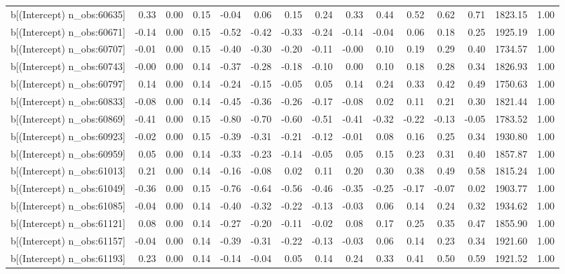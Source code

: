 \begin{table}[ht]
\begin{tabular}{rrrrrrrrrrrrrrr}
  b[(Intercept) n\_obs:60635] & 0.33 & 0.00 & 0.15 & -0.04 & 0.06 & 0.15 & 0.24 & 0.33 & 0.44 & 0.52 & 0.62 & 0.71 & 1823.15 & 1.00 \\ 
  b[(Intercept) n\_obs:60671] & -0.14 & 0.00 & 0.15 & -0.52 & -0.42 & -0.33 & -0.24 & -0.14 & -0.04 & 0.06 & 0.18 & 0.25 & 1925.19 & 1.00 \\ 
  b[(Intercept) n\_obs:60707] & -0.01 & 0.00 & 0.15 & -0.40 & -0.30 & -0.20 & -0.11 & -0.00 & 0.10 & 0.19 & 0.29 & 0.40 & 1734.57 & 1.00 \\ 
  b[(Intercept) n\_obs:60743] & -0.00 & 0.00 & 0.14 & -0.37 & -0.28 & -0.18 & -0.10 & 0.00 & 0.10 & 0.18 & 0.28 & 0.34 & 1826.93 & 1.00 \\ 
  b[(Intercept) n\_obs:60797] & 0.14 & 0.00 & 0.14 & -0.24 & -0.15 & -0.05 & 0.05 & 0.14 & 0.24 & 0.33 & 0.42 & 0.49 & 1750.63 & 1.00 \\ 
  b[(Intercept) n\_obs:60833] & -0.08 & 0.00 & 0.14 & -0.45 & -0.36 & -0.26 & -0.17 & -0.08 & 0.02 & 0.11 & 0.21 & 0.30 & 1821.44 & 1.00 \\ 
  b[(Intercept) n\_obs:60869] & -0.41 & 0.00 & 0.15 & -0.80 & -0.70 & -0.60 & -0.51 & -0.41 & -0.32 & -0.22 & -0.13 & -0.05 & 1783.52 & 1.00 \\ 
  b[(Intercept) n\_obs:60923] & -0.02 & 0.00 & 0.15 & -0.39 & -0.31 & -0.21 & -0.12 & -0.01 & 0.08 & 0.16 & 0.25 & 0.34 & 1930.80 & 1.00 \\ 
  b[(Intercept) n\_obs:60959] & 0.05 & 0.00 & 0.14 & -0.33 & -0.23 & -0.14 & -0.05 & 0.05 & 0.15 & 0.23 & 0.31 & 0.40 & 1857.87 & 1.00 \\ 
  b[(Intercept) n\_obs:61013] & 0.21 & 0.00 & 0.14 & -0.16 & -0.08 & 0.02 & 0.11 & 0.20 & 0.30 & 0.38 & 0.49 & 0.58 & 1815.24 & 1.00 \\ 
  b[(Intercept) n\_obs:61049] & -0.36 & 0.00 & 0.15 & -0.76 & -0.64 & -0.56 & -0.46 & -0.35 & -0.25 & -0.17 & -0.07 & 0.02 & 1903.77 & 1.00 \\ 
  b[(Intercept) n\_obs:61085] & -0.04 & 0.00 & 0.14 & -0.40 & -0.32 & -0.22 & -0.13 & -0.03 & 0.06 & 0.14 & 0.24 & 0.32 & 1934.62 & 1.00 \\ 
  b[(Intercept) n\_obs:61121] & 0.08 & 0.00 & 0.14 & -0.27 & -0.20 & -0.11 & -0.02 & 0.08 & 0.17 & 0.25 & 0.35 & 0.47 & 1855.90 & 1.00 \\ 
  b[(Intercept) n\_obs:61157] & -0.04 & 0.00 & 0.14 & -0.39 & -0.31 & -0.22 & -0.13 & -0.03 & 0.06 & 0.14 & 0.23 & 0.34 & 1921.60 & 1.00 \\ 
  b[(Intercept) n\_obs:61193] & 0.23 & 0.00 & 0.14 & -0.14 & -0.04 & 0.05 & 0.14 & 0.24 & 0.33 & 0.41 & 0.50 & 0.59 & 1921.52 & 1.00 \\ 

\end{tabular}
\end{table}
